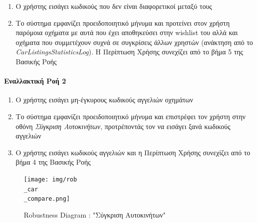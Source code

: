 \documentclass{../ol-softwaremanual}
\begin{document}
	\begin{enumerate}
		\item Ο χρήστης εισάγει κωδικούς που δεν είναι διαφορετικοί μεταξύ τους
		\item Το σύστημα εμφανίζει προειδοποιητικό μήνυμα και προτείνει στον χρήστη παρόμοια οχήματα με αυτά που έχει αποθηκεύσει στην \en wishlist \gr του αλλά και οχήματα που συμμετέχουν συχνά σε συγκρίσεις άλλων χρηστών (ανάκτηση από το \en \textit{CarListingsStatisticsLog}\gr). Η Περίπτωση Χρήσης συνεχίζει από το βήμα 5 της Βασικής Ροής
	\end{enumerate}
	
	\paragraph{Εναλλακτική Ροή 2}
	\begin{enumerate}
		\item Ο χρήστης εισάγει μη-έγκυρους κωδικούς αγγελιών οχημάτων
		\item Το σύστημα εμφανίζει προειδοποιητικό μήνυμα και επιστρέφει τον χρήστη στην οθόνη \textit{Σύγκριση Αυτοκινήτων}, προτρέποντάς τον να εισάγει ξανά κωδικούς αγγελιών
		\item Ο χρήστης εισάγει κωδικούς αγγελιών και η Περίπτωση Χρήσης συνεχίζει από το βήμα 4 της Βασικής Ροής		
	\end{enumerate}
	
	
	\begin{figure}[htbp!]
		\texttt{[image: img/rob\\\_car\\\_compare.png]}
		\caption{\en Robustness Diagram : "\gr Σύγκριση Αυτοκινήτων\en"\gr}
	\end{figure}
	
	\newpage
	\centering
	
\end{document}

